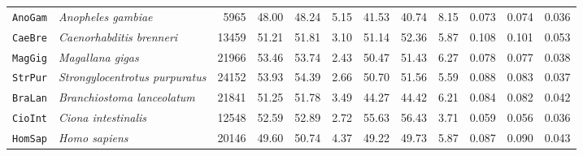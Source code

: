 \begin{table}
\begin{tabular}{llrrrrrrrrrr}
    \texttt{AnoGam} & \textit{Anopheles gambiae}             & \num{5965}  & 48.00 & 48.24 & 5.15 & 41.53 & 40.74 & 8.15 & 0.073 & 0.074 & 0.036 \\
    \texttt{CaeBre} & \textit{Caenorhabditis brenneri}       & \num{13459} & 51.21 & 51.81 & 3.10 & 51.14 & 52.36 & 5.87 & 0.108 & 0.101 & 0.053 \\
    \texttt{MagGig} & \textit{Magallana gigas}               & \num{21966} & 53.46 & 53.74 & 2.43 & 50.47 & 51.43 & 6.27 & 0.078 & 0.077 & 0.038 \\
    \texttt{StrPur} & \textit{Strongylocentrotus purpuratus} & \num{24152} & 53.93 & 54.39 & 2.66 & 50.70 & 51.56 & 5.59 & 0.088 & 0.083 & 0.037 \\
    \texttt{BraLan} & \textit{Branchiostoma lanceolatum}     & \num{21841} & 51.25 & 51.78 & 3.49 & 44.27 & 44.42 & 6.21 & 0.084 & 0.082 & 0.042 \\
    \texttt{CioInt} & \textit{Ciona intestinalis}            & \num{12548} & 52.59 & 52.89 & 2.72 & 55.63 & 56.43 & 3.71 & 0.059 & 0.056 & 0.036 \\
    \texttt{HomSap} & \textit{Homo sapiens}                  & \num{20146} & 49.60 & 50.74 & 4.37 & 49.22 & 49.73 & 5.87 & 0.087 & 0.090 & 0.043 \\
    \bottomrule
    \end{tabular}
\end{table}

